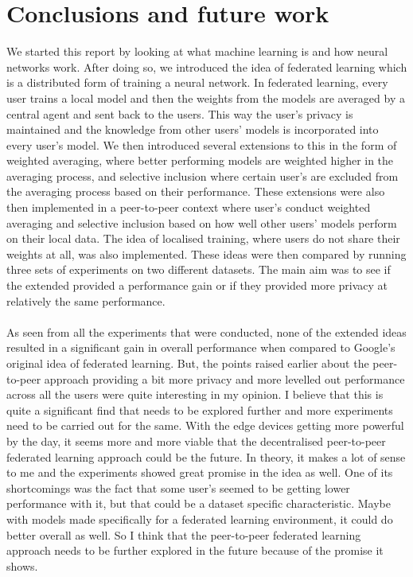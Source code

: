 \documentclass[12pt]{article}
\begin{document}
\section{Conclusions and future work}
We started this report by looking at what machine learning is and how neural networks work. After doing so, we introduced the idea of federated learning which is a distributed form of training a neural network. In federated learning, every user trains a local model and then the weights from the models are averaged by a central agent and sent back to the users. This way the user's privacy is maintained and the knowledge from other users' models is incorporated into every user's model. We then introduced several extensions to this in the form of weighted averaging, where better performing models are weighted higher in the averaging process, and selective inclusion where certain user's are excluded from the averaging process based on their performance. These extensions were also then implemented in a peer-to-peer context where user's conduct weighted averaging and selective inclusion based on how well other users' models perform on their local data. The idea of localised training, where users do not share their weights at all, was also implemented. These ideas were then compared by running three sets of experiments on two different datasets. The main aim was to see if the extended provided a performance gain or if they provided more privacy at relatively the same performance.
\\\\
As seen from all the experiments that were conducted, none of the extended ideas resulted in a significant gain in overall performance when compared to Google's original idea of federated learning. But, the points raised earlier about the peer-to-peer approach providing a bit more privacy and more levelled out performance across all the users were quite interesting in my opinion. I believe that this is quite a significant find that needs to be explored further and more experiments need to be carried out for the same. With the edge devices getting more powerful by the day, it seems more and more viable that the decentralised peer-to-peer federated learning approach could be the future. In theory, it makes a lot of sense to me and the experiments showed great promise in the idea as well. One of its shortcomings was the fact that some user's seemed to be getting lower performance with it, but that could be a dataset specific characteristic. Maybe with models made specifically for a federated learning environment, it could do better overall as well. So I think that the peer-to-peer federated learning approach needs to be further explored in the future because of the promise it shows.
\end{document}
